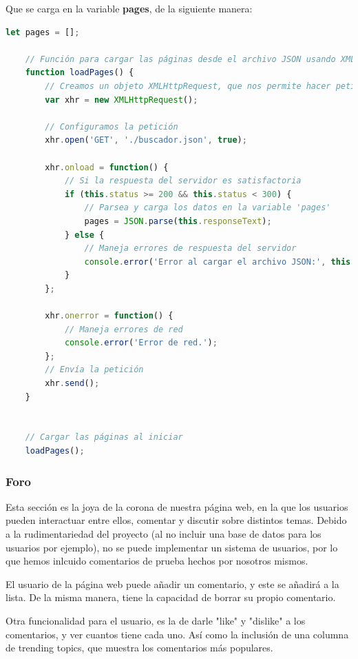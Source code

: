 \documentclass{article}
\begin{document}
Que se carga en la variable \textbf{pages}, de la siguiente manera:

\begin{lstlisting}[language=JavaScript, caption=Carga de las páginas en el JSON]
    let pages = [];

    // Función para cargar las páginas desde el archivo JSON usando XMLHttpRequest
    function loadPages() {
        // Creamos un objeto XMLHttpRequest, que nos permite hacer peticiones HTTP asíncronas
        var xhr = new XMLHttpRequest();

        // Configuramos la petición
        xhr.open('GET', './buscador.json', true);

        xhr.onload = function() {
            // Si la respuesta del servidor es satisfactoria
            if (this.status >= 200 && this.status < 300) {
                // Parsea y carga los datos en la variable 'pages'
                pages = JSON.parse(this.responseText);
            } else {
                // Maneja errores de respuesta del servidor
                console.error('Error al cargar el archivo JSON:', this.statusText);
            }
        };

        xhr.onerror = function() {
            // Maneja errores de red
            console.error('Error de red.');
        };
        // Envía la petición
        xhr.send();
    }


    // Cargar las páginas al iniciar
    loadPages();
\end{lstlisting}

\newpage

\subsubsection{Foro}

Esta sección es la joya de la corona de nuestra página web, en la que los usuarios pueden interactuar entre ellos, comentar y discutir sobre distintos temas. Debido a la rudimentariedad del proyecto (al no incluir una base de datos para los usuarios por ejemplo), no se puede implementar un sistema de usuarios, por lo que hemos inlcuido comentarios de prueba hechos por nosotros mismos.

El usuario de la página web puede añadir un comentario, y este se añadirá a la lista. De la misma manera, tiene la capacidad de borrar su propio comentario. 

Otra funcionalidad para el usuario, es la de darle "like" y "dislike" a los comentarios, y ver cuantos tiene cada uno. Así como la inclusión de una columna de trending topics, que muestra los comentarios más populares.
\end{document}
